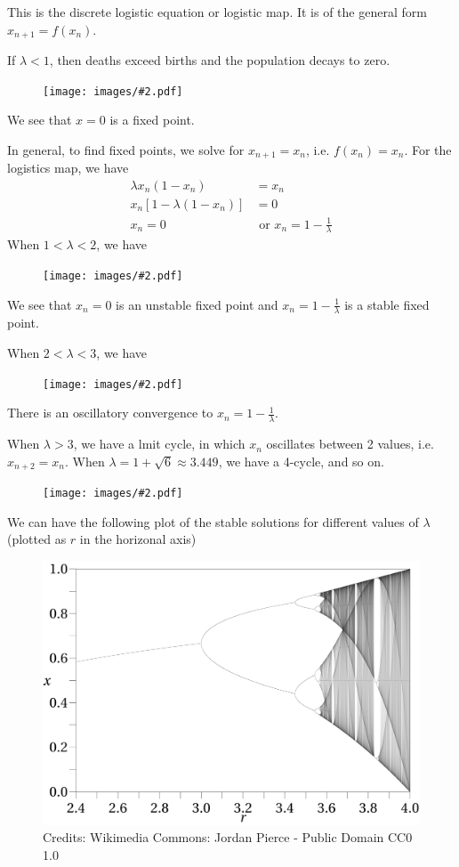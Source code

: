 \documentclass[a4paper]{article}
\theoremstyle{definition}
\newcommand{\img}[2][]{\begin{figure}[ht]\centering\texttt{[image: images/\#2.pdf]}\end{figure}}
\begin{document}
This is the discrete logistic equation or logistic map. It is of the general form $x_{n + 1} = f(x_n)$.

If $\lambda  < 1$, then deaths exceed births and the population decays to zero.

\img{de_10}

We see that $x = 0$ is a fixed point.

In general, to find fixed points, we solve for $x_{n + 1} = x_n$, i.e. $f(x_n) = x_n$. For the logistics map, we have
\begin{align*}
  \lambda x_n(1 - x_n) &= x_n\\
  x_n[1 - \lambda(1 - x_n)] &= 0\\
  x_n = 0 &\text{ or } x_n = 1 - \frac{1}{\lambda}
\end{align*}
When $1 < \lambda < 2$, we have

\img{de_11}
\newpage %
We see that $x_n = 0$ is an unstable fixed point and $x_n = 1 - \frac{1}{\lambda}$ is a stable fixed point.

When $2 < \lambda < 3$, we have
\img{de_12}

There is an oscillatory convergence to $x_n = 1 - \frac{1}{\lambda}$.

When $\lambda > 3$, we have a lmit cycle, in which $x_n$ oscillates between 2 values, i.e. $x_{n + 2} = x_n$. When $\lambda = 1 + \sqrt{6} \approx 3.449$, we have a 4-cycle, and so on. 

\img{de_13}
\newpage
We can have the following plot of the stable solutions for different values of $\lambda$ (plotted as $r$ in the horizonal axis)

\begin{figure}[ht]
  \centering
  \includegraphics[width=330pt]{images/de_15.png}
  \caption*{Credits: Wikimedia Commons: Jordan Pierce - Public Domain CC0 1.0}
  
\end{figure}
\end{document}
